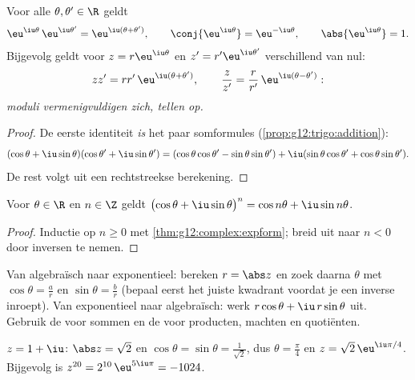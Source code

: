 \begin{theorem}\label{thm:g12:complex:expform}
Voor alle $\theta, \theta' \in \R$ geldt
\[
\eu^{\iu\theta}\,\eu^{\iu\theta'} = \eu^{\iu(\theta + \theta')},
\qquad
\conj{\eu^{\iu\theta}} = \eu^{-\iu\theta},
\qquad
\abs{\eu^{\iu\theta}} = 1 .
\]
Bijgevolg geldt voor $z = r\eu^{\iu\theta}$ en $z' = r'\eu^{\iu\theta'}$
verschillend van nul:
\[
zz' = rr'\,\eu^{\iu(\theta+\theta')},
\qquad
\frac{z}{z'} = \frac{r}{r'}\,\eu^{\iu(\theta - \theta')} :
\]
\emph{moduli vermenigvuldigen zich,  tellen op.}
\end{theorem}

\begin{proof}
De eerste identiteit \emph{is} het paar somformules
(\cref{prop:g12:trigo:addition}):
\[
(\cos\theta + \iu\sin\theta)(\cos\theta' + \iu\sin\theta')
= (\cos\theta\cos\theta' - \sin\theta\sin\theta')
+ \iu(\sin\theta\cos\theta' + \cos\theta\sin\theta').
\]
De rest volgt uit een rechtstreekse berekening.
\end{proof}

\begin{corollary}\label{cor:g12:complex:demoivre}
Voor $\theta \in \R$ en $n \in \Z$ geldt
$\bigl(\cos\theta + \iu\sin\theta\bigr)^n = \cos n\theta + \iu \sin n\theta$.
\end{corollary}

\begin{proof}
Inductie op $n \geq 0$ met \cref{thm:g12:complex:expform}; breid uit naar
$n < 0$ door inversen te nemen.
\end{proof}

\begin{method}\label{met:g12:complex:forms}
Van algebraïsch naar exponentieel: bereken $r = \abs z$ en zoek daarna
$\theta$ met $\cos\theta = \frac ar$ en $\sin\theta = \frac br$ (bepaal eerst
het juiste kwadrant voordat je een inverse  inroept). Van exponentieel
naar algebraïsch: werk $r\cos\theta + \iu\, r\sin\theta$ uit. Gebruik de
 voor sommen en de  voor producten, machten
en quotiënten.
\end{method}

\begin{example}
$z = 1 + \iu$: $\abs z = \sqrt2$ en $\cos\theta = \sin\theta =
\frac{1}{\sqrt2}$, dus $\theta = \frac\pi4$ en $z = \sqrt2\,\eu^{\iu\pi/4}$.
Bijgevolg is $z^{20} = 2^{10}\,\eu^{5\iu\pi} = -1024$.
\end{example}

